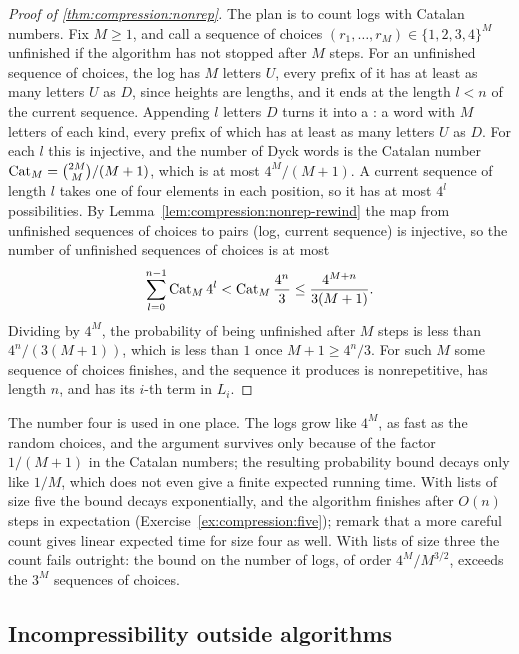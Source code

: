 \begin{refsection}
\begin{proof}[Proof of \cref{thm:compression:nonrep}]
The plan is to count logs with Catalan numbers. Fix $M\ge1$, and call a sequence of choices $(r_1,\dots,r_M)\in\{1,2,3,4\}^M$ unfinished if the algorithm has not stopped after $M$ steps. For an unfinished sequence of choices, the log has $M$ letters $U$, every prefix of it has at least as many letters $U$ as $D$, since heights are lengths, and it ends at the length $l<n$ of the current sequence. Appending $l$ letters $D$ turns it into a : a word with $M$ letters of each kind, every prefix of which has at least as many letters $U$ as $D$. For each $l$ this is injective, and the number of Dyck words is the Catalan number $\mathrm{Cat}_{M}=\binom{2M}{M}/(M+1)$, which is at most $4^M/(M+1)$. A current sequence of length $l$ takes one of four elements in each position, so it has at most $4^l$ possibilities. By Lemma~\ref{lem:compression:nonrep-rewind} the map from unfinished sequences of choices to pairs (log, current sequence) is injective, so the number of unfinished sequences of choices is at most
\[
\sum_{l=0}^{n-1}\mathrm{Cat}_{M}\,4^l<\mathrm{Cat}_{M}\,\frac{4^n}{3}\le\frac{4^{M+n}}{3(M+1)}.
\]
Dividing by $4^M$, the probability of being unfinished after $M$ steps is less than $4^n/(3(M+1))$, which is less than $1$ once $M+1\ge4^n/3$. For such $M$ some sequence of choices finishes, and the sequence it produces is nonrepetitive, has length $n$, and has its $i$-th term in $L_i$.
\end{proof}

The number four is used in one place. The logs grow like $4^M$, as fast as the random choices, and the argument survives only because of the factor $1/(M+1)$ in the Catalan numbers; the resulting probability bound decays only like $1/M$, which does not even give a finite expected running time. With lists of size five the bound decays exponentially, and the algorithm finishes after $O(n)$ steps in expectation (Exercise~\ref{ex:compression:five}); \textcite{GrytczukKozikMicek2013} remark that a more careful count gives linear expected time for size four as well. With lists of size three the count fails outright: the bound on the number of logs, of order $4^M/M^{3/2}$, exceeds the $3^M$ sequences of choices.

\subsection{Incompressibility outside algorithms}\label{sec:compression:primes}


\end{refsection}
